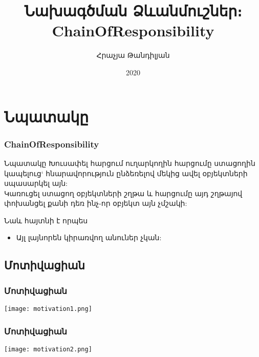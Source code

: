 \documentclass{beamer}
\begin{document}
\title[ChainOfResponsibility]{Նախագծման Ձևանմուշներ։ ChainOfResponsibility}
\author[Հրաչյա Թանդիլյան\copyright]{Հրաչյա Թանդիլյան}
\date{2020}

\begin{frame}
\titlepage
\end{frame}

\section{Նպատակը}
\begin{frame}\frametitle{ChainOfResponsibility}
\begin{block}{Նպատակը}
    Խուսափել հարցում ուղարկողին հարցումը ստացողին կապելուց` հնարավորություն
    ընձեռելով մեկից ավել օբյեկտների սպասարկել այն: \\
    \vspace{0.5cm}
    Կառուցել ստացող օբյեկտների շղթա և հարցումը այդ շղթայով փոխանցել քանի դեռ
    ինչ-որ օբյեկտ այն չմշակի:
\end{block}
\vfill
Նաև հայտնի է որպես
\begin{itemize}
    \item Այլ լայնորեն կիրառվող անուներ չկան:
\end{itemize}
\end{frame}

\subsection{Մոտիվացիան}
\begin{frame}\frametitle{Մոտիվացիան}
\begin{center}
    \texttt{[image: motivation1.png]}
\end{center}
\end{frame}

\begin{frame}\frametitle{Մոտիվացիան}
\begin{center}
    \texttt{[image: motivation2.png]}
\end{center}
\end{frame}
\end{document}
